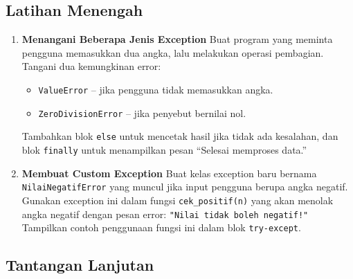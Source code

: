 \subsection*{Latihan Menengah}

\begin{enumerate}
    \item \textbf{Menangani Beberapa Jenis Exception}  
    Buat program yang meminta pengguna memasukkan dua angka, lalu melakukan operasi pembagian.  
    Tangani dua kemungkinan error:
    \begin{itemize}
        \item \texttt{ValueError} – jika pengguna tidak memasukkan angka.
        \item \texttt{ZeroDivisionError} – jika penyebut bernilai nol.
    \end{itemize}
    Tambahkan blok \texttt{else} untuk mencetak hasil jika tidak ada kesalahan, dan blok \texttt{finally} untuk menampilkan pesan “Selesai memproses data.”

    \item \textbf{Membuat Custom Exception}  
    Buat kelas exception baru bernama \texttt{NilaiNegatifError} yang muncul jika input pengguna berupa angka negatif.  
    Gunakan exception ini dalam fungsi \texttt{cek\_positif(n)} yang akan menolak angka negatif dengan pesan error:  
    \texttt{"Nilai tidak boleh negatif!"}  
    Tampilkan contoh penggunaan fungsi ini dalam blok \texttt{try-except}.
\end{enumerate}

\subsection*{Tantangan Lanjutan}

